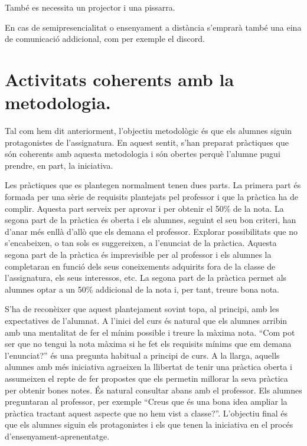 \documentclass[catalan, a4paper, 12pt, titlepage]{article}
\begin{document}
També es necessita un projector i una pissarra.

En cas de semipresencialitat o ensenyament a distància s'emprarà també una eina de comunicació addicional, com per exemple el discord.

\section{Activitats coherents amb la metodologia.}
\label{sec:activitats_coherents}

Tal com hem dit anteriorment, l'objectiu metodològic és que els alumnes siguin protagonistes de l'assignatura.
En aquest sentit, s'han preparat pràctiques que són coherents amb aquesta metodologia i són obertes perquè l'alumne pugui prendre, en part, la iniciativa.

Les pràctiques que es plantegen normalment tenen dues parts.
La primera part és formada per una sèrie de requisits plantejats pel professor i que la pràctica ha de complir. 
Aquesta part serveix per aprovar i per obtenir el 50\% de la nota.
La segona part de la pràctica és oberta i els alumnes, seguint el seu bon criteri, han d'anar més enllà d'allò que els demana el professor.
Explorar possibilitats que no s'encabeixen, o tan sols es suggereixen, a l'enunciat de la pràctica.
Aquesta segona part de la pràctica és imprevisible per al professor i els alumnes la completaran en funció dels seus coneixements adquirits fora de la classe de l'assignatura, els seus interessos, etc.
La segona part de la pràctica permet als alumnes optar a un 50\% addicional de la nota i, per tant, treure bona nota.

S'ha de reconèixer que aquest plantejament sovint topa, al principi, amb les expectatives de l'alumnat.
A l'inici del curs és natural que els alumnes arribin amb una mentalitat de fer el mínim possible i treure la màxima nota.
``Com pot ser que no tengui la nota màxima si he fet els requisits mínims que em demana l'enunciat?'' és una pregunta habitual a principi de curs.
A la llarga, aquells alumnes amb més iniciativa agraeixen la llibertat de tenir una pràctica oberta i assumeixen el repte de fer propostes que els permetin millorar la seva pràctica per obtenir bones notes.
És natural consultar abans amb el professor. 
Els alumnes preguntaran al professor, per exemple ``Creus que és una bona idea ampliar la pràctica tractant aquest aspecte que no hem vist a classe?''.
L'objectiu final és que els alumnes siguin els protagonistes i els que tenen la iniciativa en el procés d'ensenyament-aprenentatge.
\end{document}
